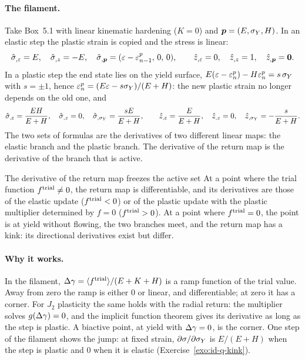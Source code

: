 \paragraph{The filament.}
%
Take Box~5.1 with linear kinematic hardening ($K=0$) and $\bm{p}=(E,\sigma_{Y},H)$. In an
elastic step the plastic strain is copied and the stress is linear:
\[
  \hat\sigma_{,\varepsilon}=E,\quad \hat\sigma_{,z}=-E,\quad
  \hat\sigma_{,\bm{p}}=(\varepsilon-\varepsilon^p_{n-1},\,0,\,0),\qquad
  \hat z_{,\varepsilon}=0,\quad \hat z_{,z}=1,\quad \hat z_{,\bm{p}}=\bm{0} .
\]
In a plastic step the end state lies on the yield surface,
$E(\varepsilon-\varepsilon^p_n)-H\varepsilon^p_n=s\,\sigma_{Y}$ with $s=\pm1$, hence
$\varepsilon^p_n=(E\varepsilon-s\sigma_{Y})/(E+H)$: the new plastic strain no longer depends
on the old one, and
\[
  \hat\sigma_{,\varepsilon}=\frac{EH}{E+H},\quad \hat\sigma_{,z}=0,\quad
  \hat\sigma_{,\sigma_{Y}}=\frac{sE}{E+H},\qquad
  \hat z_{,\varepsilon}=\frac{E}{E+H},\quad \hat z_{,z}=0,\quad
  \hat z_{,\sigma_{Y}}=-\frac{s}{E+H} .
\]
The two sets of formulas are the derivatives of two different linear maps: the
elastic branch and the plastic branch. The derivative of the return map is
the derivative of the branch that is active.

\begin{gbox}{The derivative of the return map freezes the active set}\label{prop:id-rm}
At a point where the trial function $f^{\mathrm{trial}}\ne0$, the return map is
differentiable, and its derivatives are those of the elastic update ($f^{\mathrm{trial}}<0$)
or of the plastic update with the plastic multiplier determined by $f=0$
($f^{\mathrm{trial}}>0$). At a point where $f^{\mathrm{trial}}=0$, the point is at yield without
flowing, the two branches meet, and the return map has a kink: its
directional derivatives exist but differ.
\end{gbox}
\paragraph{Why it works.} In the filament, $\Delta\gamma=\langle f^{\mathrm{trial}}\rangle/(E+K+H)$ is a ramp
function of the trial value. Away from zero the ramp is either $0$ or linear,
and differentiable; at zero it has a corner. For $J_2$ plasticity the same holds
with the radial return: the multiplier solves $g(\Delta\gamma)=0$, and the implicit
function theorem gives its derivative as long as the step is plastic. A biactive
point, at yield with $\Delta\gamma=0$, is the corner. One step of the filament shows the
jump: at fixed strain, $\partial\sigma/\partial\sigma_{Y}$ is $E/(E+H)$ when the step is
plastic and $0$ when it is elastic (Exercise~\ref{exo:id-q-kink}).

